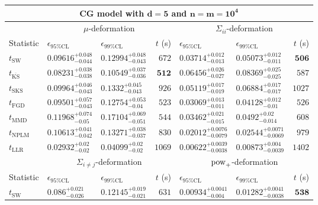 \begin{tabular}{l|llr|llr}
	\toprule
	\multicolumn{7}{c}{{\bf CG model with $\mathbf{d=5}$ and $\mathbf{n=m=10^{4}}$}} \\
	\toprule
	\multicolumn{1}{c}{} & \multicolumn{3}{c}{$\mu$-deformation} & \multicolumn{3}{c}{$\Sigma_{ii}$-deformation} \\
	Statistic & $\epsilon_{95\%\mathrm{CL}}$ & $\epsilon_{99\%\mathrm{CL}}$ & $t$ (s) & $\epsilon_{95\%\mathrm{CL}}$ & $\epsilon_{99\%\mathrm{CL}}$ & $t$ (s) \\
	\midrule
	$t_{\mathrm{SW}}$ & $0.09616_{-0.044}^{+0.048}$ & $0.12994_{-0.043}^{+0.048}$ & $672$ & $0.03714_{-0.013}^{+0.012}$ & $0.05073_{-0.011}^{+0.012}$ & ${\mathbf{506}}$ \\
	$t_{\overline{\mathrm{KS}}}$ & ${\mathbf{0.08231_{-0.038}^{+0.038}}}$ & ${\mathbf{0.10549_{-0.036}^{+0.037}}}$ & ${\mathbf{512}}$ & $0.06456_{-0.027}^{+0.026}$ & $0.08369_{-0.025}^{+0.025}$ & $587$ \\
	$t_{\mathrm{SKS}}$ & $0.09964_{-0.043}^{+0.046}$ & $0.1332_{-0.043}^{+0.045}$ & $926$ & $0.05119_{-0.019}^{+0.017}$ & $0.06884_{-0.017}^{+0.017}$ & $1027$ \\
	$t_{\mathrm{FGD}}$ & $0.09501_{-0.043}^{+0.057}$ & $0.12754_{-0.04}^{+0.053}$ & $523$ & ${\mathbf{0.03069_{-0.011}^{+0.013}}}$ & ${\mathbf{0.04128_{-0.01}^{+0.012}}}$ & $526$ \\
	$t_{\mathrm{MMD}}$ & $0.11968_{-0.05}^{+0.074}$ & $0.17104_{-0.051}^{+0.069}$ & $544$ & $0.03462_{-0.015}^{+0.021}$ & $0.0492_{-0.014}^{+0.02}$ & $608$ \\
\rowcolor{red!35}	$t_{\mathrm{NPLM}}$ & $0.10613_{-0.042}^{+0.041}$ & $0.13271_{-0.037}^{+0.038}$ & $830$ & $0.02012_{-0.0079}^{+0.0076}$ & $0.02544_{-0.0069}^{+0.0071}$ & $979$ \\
	$t_{\mathrm{LLR}}$ & $0.02932_{-0.02}^{+0.02}$ & $0.04099_{-0.02}^{+0.02}$ & $1069$ & $0.00622_{-0.0038}^{+0.0039}$ & $0.00873_{-0.0039}^{+0.004}$ & $1402$ \\
	\toprule
	\multicolumn{1}{c}{} & \multicolumn{3}{c}{$\Sigma_{i\neq j}$-deformation} & \multicolumn{3}{c}{$\rm{pow}_{+}$-deformation} \\
	Statistic & $\epsilon_{95\%\mathrm{CL}}$ & $\epsilon_{99\%\mathrm{CL}}$ & $t$ (s) & $\epsilon_{95\%\mathrm{CL}}$ & $\epsilon_{99\%\mathrm{CL}}$ & $t$ (s) \\
	\midrule
	$t_{\mathrm{SW}}$ & $0.086_{-0.026}^{+0.021}$ & $0.12145_{-0.021}^{+0.019}$ & $631$ & $0.00934_{-0.004}^{+0.0041}$ & $0.01282_{-0.0038}^{+0.0041}$ & ${\mathbf{538}}$ \\

\end{tabular}
